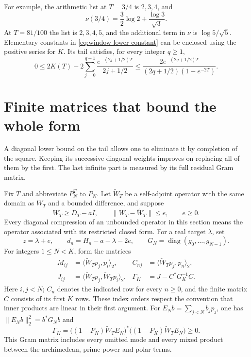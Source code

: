 \documentclass[11pt]{article}
\theoremstyle{definition}
\theoremstyle{remark}
\numberwithin{equation}{section}
\begin{document}
For example, the arithmetic list at $T=3/4$ is $2,3,4$, and
\[
 \nu(3/4)=\frac32\log2+\frac{\log3}{\sqrt3}.
\]
At $T=81/100$ the list is $2,3,4,5$, and the additional term in
$\nu$ is $\log5/\sqrt5$.  Elementary constants in
\eqref{eq:window-lower-constant} can be enclosed using the positive
series for $K$.  Its tail satisfies, for every integer $q\ge1$,
\[
 0\le2K(T)-2\sum_{j=0}^{q-1}
       \frac{e^{-(2j+1/2)T}}{2j+1/2}
 \le\frac{2e^{-(2q+1/2)T}}
          {(2q+1/2)(1-e^{-2T})}.
\]

\section{Finite matrices that bound the whole form}
\label{sec:window-schur}

A diagonal lower bound on the tail allows one to eliminate it by
completion of the square.  Keeping its successive diagonal weights
improves on replacing all of them by the first.  The last infinite
part is measured by its full residual Gram matrix.

Fix $T$ and abbreviate $P_N^T$ to $P_N$.  Let $\widetilde W_T$
be a self-adjoint operator with the same domain as $W_T$ and a
bounded difference, and suppose
\[
 W_T\ge D_T-aI,\qquad \|W_T-\widetilde W_T\|\le e,
 \qquad e\ge0.
\]
Every diagonal compression of an unbounded operator in this section
means the operator associated with its restricted closed form.
For a real target $\lambda$, set
\begin{equation}
 z=\lambda+e,\qquad d_n=H_n-a-\lambda-2e,
 \qquad G_N=\operatorname{diag}(g_0,\ldots,g_{N-1}).
 \label{eq:window-shifts}
\end{equation}
For integers $1\le N<K$, form the matrices
\begin{equation}
\begin{aligned}
 M_{ij}&=\langle\widetilde W_Tp_j,p_i\rangle_2,&
 C_{nj}&=\langle\widetilde W_Tp_j,p_n\rangle_2,\\
 J_{ij}&=\langle\widetilde W_Tp_j,\widetilde W_Tp_i\rangle_2,&
 \Gamma_K&=J-C^*G_K^{-1}C.
\end{aligned}
\label{eq:window-moments}
\end{equation}
Here $i,j<N$; $C_n$ denotes the indicated row for every $n\ge0$,
and the finite matrix $C$ consists of its first $K$ rows.  These index
orders respect the convention that inner products are linear in
their first argument.  For $E_Nb=\sum_{j<N}b_jp_j$, one has
$\|E_Nb\|_2^2=b^*G_Nb$ and
\[
 \Gamma_K=\bigl((1-P_K)\widetilde W_TE_N\bigr)^*
                  \bigl((1-P_K)\widetilde W_TE_N\bigr)\ge0.
\]
This Gram matrix includes every omitted mode and every mixed product
between the archimedean, prime-power and polar terms.
\end{document}
